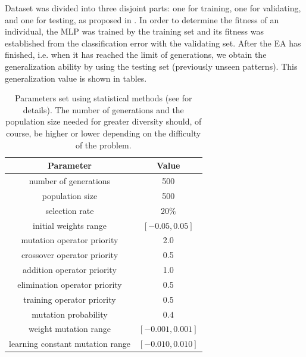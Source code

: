 \documentclass[final,1p,times]{elsarticle}
\begin{document}
Dataset was divided into three disjoint parts: one for training, one for validating, and one for testing, as proposed in \cite{Prechelt94c}. 
In order to determine the fitness of an individual, the MLP was trained by the training set and its fitness was established from the classification error with the validating set.
After the EA has finished, i.e. when it has reached the limit of generations, we obtain the generalization ability by using the testing set (previously unseen patterns). This generalization value is shown in tables.


\begin{table}[!h]
\small{
\begin{tabular}{|c|c|}
\hline 
Parameter & Value \\
\hline
\hline
\hline
number of generations   & 500 \\
\hline
population size & 500 \\
\hline
selection rate  & $20\%$ \\
\hline
initial weights range  & $[-0.05,0.05]$ \\
\hline
\hline
mutation operator priority        & 2.0   \\
\hline
crossover operator priority             & 0.5 \\
\hline
addition operator priority & 1.0   \\
\hline
elimination operator priority     & 0.5   \\
\hline
training operator priority     & 0.5   \\
\hline
\hline

mutation probability     & $0.4$   \\
\hline
weight mutation range     & $[-0.001,0.001]$   \\
\hline
learning constant mutation range     & $[-0.010,0.010]$   \\


\hline
\end{tabular}
}
\caption{Parameters set using statistical methods (see \cite{CastilloIEEETNN} for details). The number of generations and the population size needed for greater diversity should, of course, be higher or lower depending on the difficulty of the problem.  \label{tabla:parametros} }
\end{table}
\end{document}
